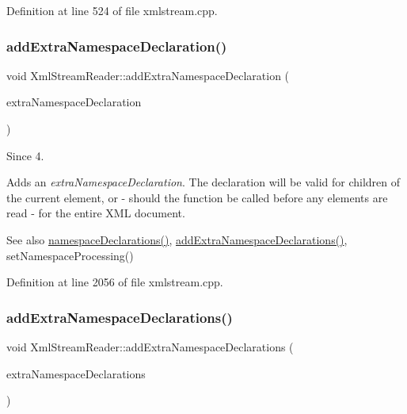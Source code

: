 Definition at line 524 of file xmlstream.\+cpp.

\mbox{\label{class_xml_stream_reader_a6c6b71cc9f62ad5c1b85c207ba1be850}} 
\subsubsection{\texorpdfstring{add\+Extra\+Namespace\+Declaration()}{addExtraNamespaceDeclaration()}}
{\footnotesize\ttfamily void Xml\+Stream\+Reader\+::add\+Extra\+Namespace\+Declaration (\begin{DoxyParamCaption}\item[{const \hyperlink{class_xml_stream_namespace_declaration}{Xml\+Stream\+Namespace\+Declaration} \&}]{extra\+Namespace\+Declaration }\end{DoxyParamCaption})}

\begin{DoxySince}{Since}
4.
\end{DoxySince}
Adds an {\itshape extra\+Namespace\+Declaration}. The declaration will be valid for children of the current element, or -\/ should the function be called before any elements are read -\/ for the entire X\+ML document.

\begin{DoxySeeAlso}{See also}
\hyperlink{class_xml_stream_reader_a3e6033d64f3744d90e96287f3a04d913}{namespace\+Declarations()}, \hyperlink{class_xml_stream_reader_a8661643768d54c1c49645a59abed5d29}{add\+Extra\+Namespace\+Declarations()}, set\+Namespace\+Processing() 
\end{DoxySeeAlso}


Definition at line 2056 of file xmlstream.\+cpp.

\mbox{\label{class_xml_stream_reader_a8661643768d54c1c49645a59abed5d29}} 
\subsubsection{\texorpdfstring{add\+Extra\+Namespace\+Declarations()}{addExtraNamespaceDeclarations()}}
{\footnotesize\ttfamily void Xml\+Stream\+Reader\+::add\+Extra\+Namespace\+Declarations (\begin{DoxyParamCaption}\item[{const Xml\+Stream\+Namespace\+Declarations \&}]{extra\+Namespace\+Declarations }\end{DoxyParamCaption})}

